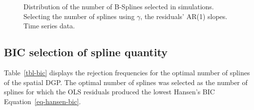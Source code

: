 \documentclass[
]{article}
\begin{document}
\begin{figure}

\begin{minipage}[t]{0.50\linewidth}

{\centering 


}

\end{minipage}%
%
\begin{minipage}[t]{0.50\linewidth}

{\centering 


}

\end{minipage}%

\caption{\label{fig-gamma-splines-ts}Distribution of the number of
B-Splines selected in simulations. Selecting the number of splines using
\(\gamma\), the residuals' AR(1) slopes. Time series data.}

\end{figure}

\hypertarget{bic-selection-of-spline-quantity}{%
\subsection{BIC selection of spline
quantity}\label{bic-selection-of-spline-quantity}}

Table~\ref{tbl-bic} displays the rejection frequencies for the optimal
number of splines of the spatial DGP. The optimal number of splines was
selected as the number of splines for which the OLS residuals produced
the lowest Hansen's BIC Equation~\ref{eq-hansen-bic}.
\end{document}
